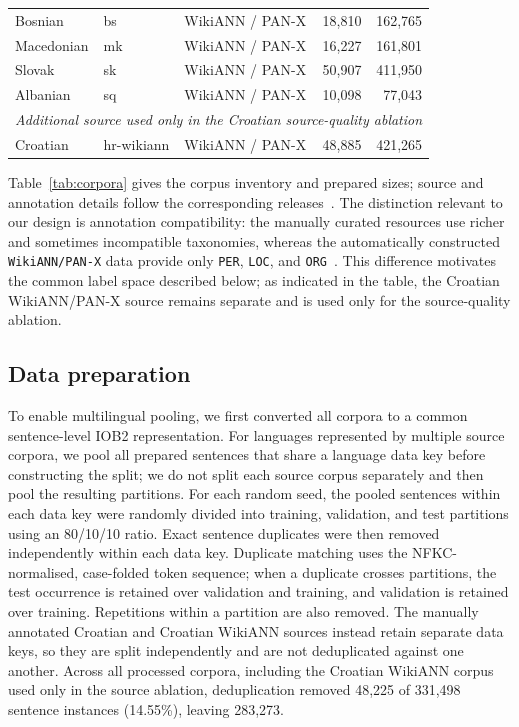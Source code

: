 \documentclass{article}
\begin{document}
\begin{table}[H]
{\begin{tabular}{lllrr}
Bosnian & bs & WikiANN / PAN-X & 18,810 & 162,765 \\
Macedonian & mk & WikiANN / PAN-X & 16,227 & 161,801 \\
Slovak & sk & WikiANN / PAN-X & 50,907 & 411,950 \\
Albanian & sq & WikiANN / PAN-X & 10,098 & 77,043  \\
\midrule
\multicolumn{5}{l}{\textit{Additional source used only in the Croatian source-quality ablation}} \\
Croatian & hr-wikiann & WikiANN / PAN-X & 48,885 & 421,265 \\
\bottomrule
\end{tabular}
}
\end{table}
 
Table~\ref{tab:corpora} gives the corpus inventory and prepared sizes; source and annotation details follow the corresponding releases~\parencite{piskorski-etal-2021-slav,piskorski-etal-2024-cross,CNEC-2.0,hr500k-10,SUK-1.0,ssj500k-23,ELEXIS-WSD-10,SentiCoref-10,SETimes-SR-1.0,chaplynskyi-romanyshyn-2024-introducing}.
The distinction relevant to our design is annotation compatibility: the manually curated resources use richer and sometimes incompatible taxonomies, whereas the automatically constructed \texttt{WikiANN/PAN-X} data provide only \texttt{PER}, \texttt{LOC}, and \texttt{ORG}~\parencite{rahimi-etal-2019-massively}.
This difference motivates the common label space described below; as indicated in the table, the Croatian WikiANN/PAN-X source remains separate and is used only for the source-quality ablation.

\subsection{Data preparation}
\label{sec:corpus_prep}
To enable multilingual pooling, we first converted all corpora to a common sentence-level IOB2 representation.
For languages represented by multiple source corpora, we pool all prepared sentences that share a language data key before constructing the split; we do not split each source corpus separately and then pool the resulting partitions.
For each random seed, the pooled sentences within each data key were randomly divided into training, validation, and test partitions using an 80/10/10 ratio.
Exact sentence duplicates were then removed independently within each data key.
Duplicate matching uses the NFKC-normalised, case-folded token sequence; when a duplicate crosses partitions, the test occurrence is retained over validation and training, and validation is retained over training.
Repetitions within a partition are also removed.
The manually annotated Croatian and Croatian WikiANN sources instead retain separate data keys, so they are split independently and are not deduplicated against one another.
Across all processed corpora, including the Croatian WikiANN corpus used only in the source ablation, deduplication removed 48,225 of 331,498 sentence instances (14.55\%), leaving 283,273.
\end{document}
